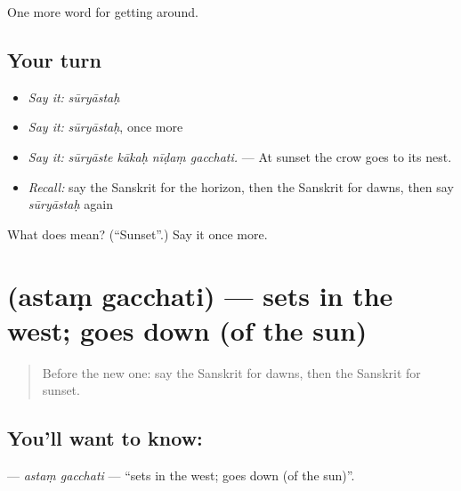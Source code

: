 \begin{grammarlens}[title={What you've built}]
One more word for getting around.
\end{grammarlens}

\subsection*{Your turn}
\begin{itemize}
\raggedright
  \item \emph{Say it:} \emph{sūryāstaḥ}
  \item \emph{Say it:} \emph{sūryāstaḥ}, once more
  \item \emph{Say it:} \emph{sūryāste kākaḥ nīḍaṃ gacchati.} — At sunset the crow goes to its nest.
  \item \emph{Recall:} say the Sanskrit for the horizon, then the Sanskrit for dawns, then say \emph{sūryāstaḥ} again
\end{itemize}

\begin{tcolorbox}[breakable,colback=teal!4,colframe=teal!35!black,title={Before you move on}]
What does  mean? (\textquotedblleft{}Sunset\textquotedblright{}.) Say it once more.
\end{tcolorbox}
\section[\texorpdfstring{\sk{अस्तं} \sk{गच्छति} (astaṃ gacchati)}{अस्तं गच्छति (astaṃ gacchati)}]{  (astaṃ gacchati) — sets in the west; goes down (of the sun)}

\label{lesson:SA-C443-astam-gacchati}



\begin{quote}
Before the new one: say the Sanskrit for dawns, then the Sanskrit for sunset.
\end{quote}

\subsection*{You'll want to know:  }
\textbf{ } — \emph{astaṃ gacchati} — \textquotedblleft{}sets in the west; goes down (of the sun)\textquotedblright{}.

\begin{quote}
   
\end{quote}

